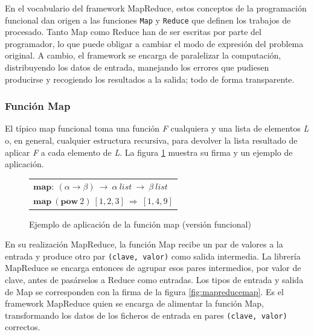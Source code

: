 En el vocabulario del framework MapReduce, estos conceptos de la programaci\'on funcional dan origen a las funciones \texttt{Map} y \texttt{Reduce} que definen los trabajos de procesado. Tanto Map como Reduce han de ser escritas por parte del programador, lo que puede obligar a cambiar el modo de expresi\'on del problema original. A cambio, el framework se encarga de paralelizar la computaci\'on, distribuyendo los datos de entrada, manejando los errores que pudiesen producirse y recogiendo los resultados a la salida; todo de forma transparente.


\subsubsection{Funci\'on Map}\label{map}
\noindent El t\'ipico map funcional toma una funci\'on \emph{F} cualquiera y una lista de elementos \emph{L} o, en general, cualquier estructura recursiva, para devolver la lista resultado de aplicar \emph{F} a cada elemento de \emph{L}. La figura \ref{fig:functionalmap} muestra su firma y un ejemplo de aplicaci\'on.\newline

\begin{figure}[tbp]
\begin{center}
\begin{tabular}{|l|}
\hline
$\mathbf{map:} \: \left ( \alpha \rightarrow \beta \right ) \: \rightarrow \: \alpha \: list \: \rightarrow \: \beta \: list$ \\
$\mathbf{map} \: \left( \mathbf{pow}\:2 \right) \: \left[ 1,2,3 \right] \: \Rightarrow \: \left[ 1,4,9 \right ]$ \\
\hline
\end{tabular}
\caption{Ejemplo de aplicaci\'on de la funci\'on map (versi\'on funcional)}
\label{fig:functionalmap}
\end{center}
\end{figure}

En su realizaci\'on MapReduce, la funci\'on Map recibe un par de valores a la entrada y produce otro par \texttt{(clave, valor)} como salida intermedia. La librer\'ia MapReduce se encarga entonces de agrupar esos pares intermedios, por valor de clave, antes de pas\'arselos a Reduce como entradas. Los tipos de entrada y salida de Map se corresponden con la firma de la figura \ref{fig:mapreducemap}. Es el framework MapReduce quien se encarga de alimentar la funci\'on Map, transformando los datos de los ficheros de entrada en pares \texttt{(clave, valor)} correctos.

